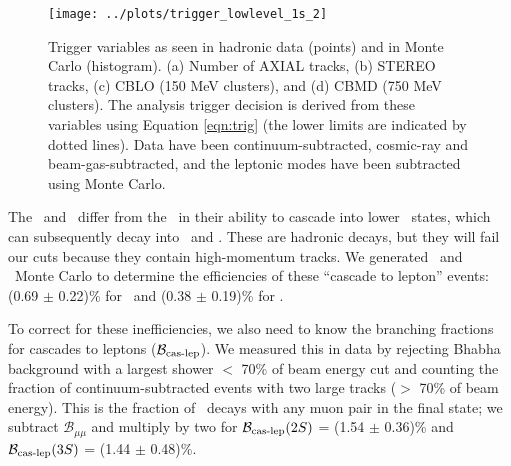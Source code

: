\documentclass[aps,prd,preprint,superscriptaddress,tightenlines,nofootinbib,floatfix]{revtex4}
\begin{document}
\begin{figure}[p]
  \vspace{3 cm}
  \begin{center}
    \texttt{[image: ../plots/trigger\_lowlevel\_1s\_2]}
  \end{center}
  \caption{\label{fig:mctrig} Trigger variables as seen in hadronic
    data (points) and in Monte Carlo (histogram).  (a) Number of AXIAL
    tracks, (b) STEREO tracks, (c) CBLO (150 MeV clusters), and (d)
    CBMD (750 MeV clusters).  The analysis trigger decision is derived
    from these variables using Equation \ref{eqn:trig} (the lower
    limits are indicated by dotted lines).  Data have been
    continuum-subtracted, cosmic-ray and beam-gas-subtracted, and the
    leptonic modes have been subtracted using Monte Carlo.}
\end{figure}

The \utwo\ and \uthree\ differ from the \uone\ in their ability to
cascade into lower \ups\ states, which can subsequently decay into
\ee\ and \mm.  These are hadronic decays, but they will fail our cuts
because they contain high-momentum tracks.  We generated \utwo\ and
\uthree\ Monte Carlo to determine the efficiencies of these ``cascade
to lepton'' events: (0.69 $\pm$ 0.22)\% for \utwo\ and (0.38 $\pm$
0.19)\% for \uthree.

To correct for these inefficiencies, we also need to know the
branching fractions for cascades to leptons
($\mathcal{B}_{\mbox{\scriptsize cas-lep}}$).  We measured this in data by rejecting
Bhabha background with a largest shower $<$ 70\% of beam energy cut
and counting the fraction of continuum-subtracted events with two
large tracks ($>$ 70\% of beam energy).  This is the fraction of \ups\
decays with any muon pair in the final state; we subtract
$\mathcal{B}_{\mu\mu}$ and multiply by two for
$\mathcal{B}_{\mbox{\scriptsize cas-lep}}(2S)$ = (1.54 $\pm$ 0.36)\% and
$\mathcal{B}_{\mbox{\scriptsize cas-lep}}(3S)$ = (1.44 $\pm$ 0.48)\%.
\end{document}
